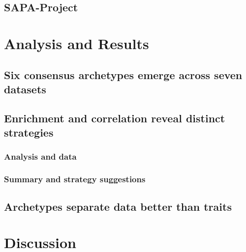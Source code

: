 \documentclass[a4paper]{article}
\begin{document}
	\subsection{SAPA-Project \label{subsec:SAPA}}
	

\newpage
\setcounter{figure}{0}
\thispagestyle{plain}


\section{Analysis and Results\label{sec:results}}


	\subsection{Six consensus archetypes emerge across seven datasets \label{subsec:consensusArchetypes}}
	

	\subsection{Enrichment and correlation reveal distinct strategies\label{subsec:enrichment}}
	

		\subsubsection{Analysis and data \label{subsubsec:analysisAndData}}
		

		\subsubsection{Summary and strategy suggestions \label{subsubsec:summary}}
		

	\newpage
	\subsection{Archetypes separate data better than traits \label{subsec:classification}}
	

\newpage
\setcounter{figure}{0}
\thispagestyle{plain}


\newpage
\section{Discussion \label{sec:discussion}}

\end{document}
